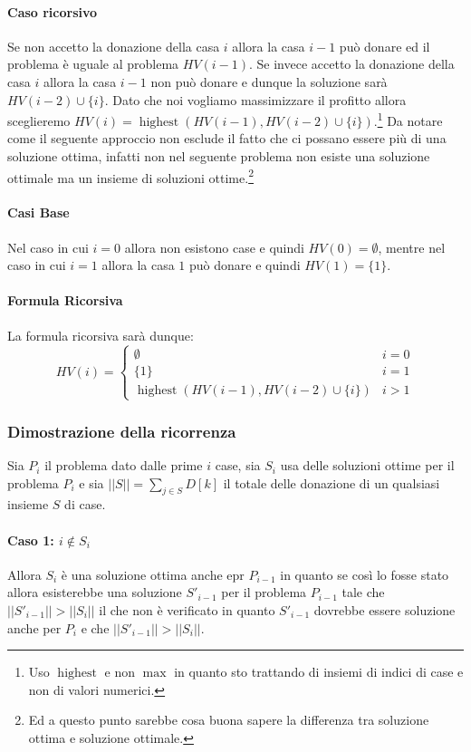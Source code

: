                 \paragraph{Caso ricorsivo} Se non accetto la donazione della casa $i$ allora la casa $i-1$ può donare ed il problema è uguale al problema $HV(i-1)$.
                Se invece accetto la donazione della casa $i$ allora la casa $i-1$ non può donare e dunque la soluzione sarà $HV(i-2) \cup \{i\}$. Dato che noi vogliamo massimizzare il profitto allora sceglieremo $HV(i)=\operatorname{highest}(HV(i-1), HV(i-2) \cup \{i\})$.\footnote{Uso $\operatorname{highest}$ e non $\max$ in quanto sto trattando di insiemi di indici di case e non di valori numerici.}\newline
                Da notare come il seguente approccio non esclude il fatto che ci possano essere più di una soluzione ottima, infatti non nel seguente problema non esiste una soluzione ottimale ma un insieme di soluzioni ottime.\footnote{Ed a questo punto sarebbe cosa buona sapere la differenza tra soluzione ottima e soluzione ottimale.}
                \paragraph{Casi Base} Nel caso in cui $i=0$ allora non esistono case e quindi $HV(0)=\emptyset$, mentre nel caso in cui $i=1$ allora la casa $1$ può donare e quindi $HV(1)=\{1\}$.
                \paragraph{Formula Ricorsiva} La formula ricorsiva sarà dunque:
                $$
                    HV(i)=\begin{cases}
                        \emptyset & i=0 \\
                        \{1\} & i=1 \\
                        \operatorname{highest}(HV(i-1), HV(i-2)\cup \{i\}) & i>1
                    \end{cases}
                $$
            \subsubsection{Dimostrazione della ricorrenza}
                Sia $P_i$ il problema dato dalle prime $i$ case, sia $S_i$ usa delle soluzioni ottime per il problema $P_i$ e sia $||S||=\sum_{j\in S}D[k]$ il totale delle donazione di un qualsiasi insieme $S$ di case.
                \paragraph{Caso 1: $i\not\in S_i$} Allora $S_i$ è una soluzione ottima anche epr $P_{i-1}$ in quanto se così lo fosse stato allora esisterebbe una soluzione $S'_{i-1}$ per il problema $P_{i-1}$ tale che $||S'_{i-1}||>||S_{i}||$ il che non è verificato in quanto $S'_{i-1}$ dovrebbe essere soluzione anche per $P_i$ e che $||S'_{i-1}||>||S_i||$. 
